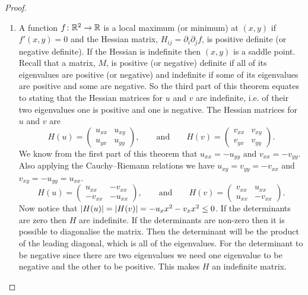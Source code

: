 \documentclass{article}
\begin{document}
\begin{proof}
\begin{enumerate}[label=(\roman*)]
            \item A function \(f\colon\mathbb{R}^2\to\mathbb{R}\) is a local maximum (or minimum) at \((x, y)\) if \(f'(x, y) = 0\) and the Hessian matrix, \(H_{ij} = \partial_i\partial_j f\), is positive definite (or negative definite).
            If the Hessian is indefinite then \((x, y)\) is a saddle point.
            Recall that a matrix, \(M\), is positive (or negative) definite if all of its eigenvalues are positive (or negative) and indefinite if some of its eigenvalues are positive and some are negative.
            So the third part of this theorem equates to stating that the Hessian matrices for \(u\) and \(v\) are indefinite, i.e. of their two eigenvalues one is positive and one is negative.
            The Hessian matrices for \(u\) and \(v\) are
            \[
                H(u) =
                \begin{pmatrix}
                    u_{xx} & u_{xy}\\
                    u_{yx} & u_{yy}
                \end{pmatrix}
                , \qquad\text{and}\qquad H(v) =
                \begin{pmatrix}
                    v_{xx} & v_{xy}\\
                    v_{yx} & v_{yy}
                \end{pmatrix}
                .
            \]
            We know from the first part of this theorem that \(u_{xx} = -u_{yy}\) and \(v_{xx} = -v_{yy}\).
            Also applying the Cauchy--Riemann relations we have \(u_{xy} = v_{yy} = -v_{xx}\) and \(v_{xy} = -u_{yy} = u_{xx}\).
            \[
                H(u) =
                \begin{pmatrix}
                    u_{xx} & -v_{xx}\\
                    -v_{xx} & -u_{xx}
                \end{pmatrix}
                , \qquad\text{and}\qquad H(v) =
                \begin{pmatrix}
                    v_{xx} & u_{xx}\\
                    u_{xx} & -v_{xx}
                \end{pmatrix}
                .
            \]
            Now notice that \(\abs{H(u)} = \abs{H(v)} = -u_xx^2 - v_xx^2 \le 0\).
            If the determinants are zero then \(H\) are indefinite.
            If the determinants are non-zero then it is possible to diagonalise the matrix.
            Then the determinant will be the product of the leading diagonal, which is all of the eigenvalues.
            For the determinant to be negative since there are two eigenvalues we need one eigenvalue to be negative and the other to be positive.
            This makes \(H\) an indefinite matrix.
        \end{enumerate}
    \end{proof}
    
\end{document}
